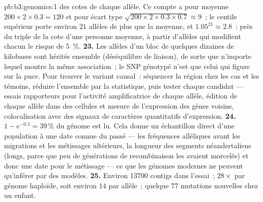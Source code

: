 \begin{solution}{pb:b3:genomics:1}
des cotes de chaque allèle. Ce compte a pour moyenne
$200\times 2\times 0.3 = 120$ et pour écart type
$\sqrt{200\times 2\times 0.3\times 0.7} \approx 9$~; le centile
supérieur porte environ $21$ allèles de plus que la moyenne, et
$1.05^{21} \approx
2.8$~: près du triple de la cote d'une personne moyenne, à partir
d'allèles qui modifient chacun le risque de \qty{5}{\%}.
\textbf{23.} Les allèles d'un bloc de quelques dizaines de kilobases
sont hérités ensemble (déséquilibre de liaison), de sorte que n'importe
lequel montre la même association~; le SNP génotypé n'est que celui qui
figure sur la puce. Pour trouver le variant causal~: séquencer la région
chez les cas et les témoins, réduire l'ensemble par la statistique, puis
tester chaque candidat --- essais rapporteurs pour l'activité
amplificatrice de chaque allèle, édition de chaque allèle dans des
cellules et mesure de l'expression des gènes voisins, colocalisation
avec des signaux de caractères quantitatifs d'expression.
\textbf{24.} $1 - e^{-0.5} = 39\,\%$ du génome est lu. Cela donne un
échantillon direct d'une population à une date connue du passé --- les
fréquences alléliques avant les migrations et les métissages ultérieurs,
la longueur des segments néandertaliens (longs, parce que peu de
générations de recombinaison les avaient morcelés) et donc une date pour
le métissage --- ce que les génomes modernes ne peuvent qu'inférer par
des modèles.
\textbf{25.} Environ \num{13700} contigs dans l'essai~; $28\times$ par
génome haploïde, soit environ $14$  par allèle~; quelque $77$
mutations nouvelles chez un enfant.
\end{solution}
